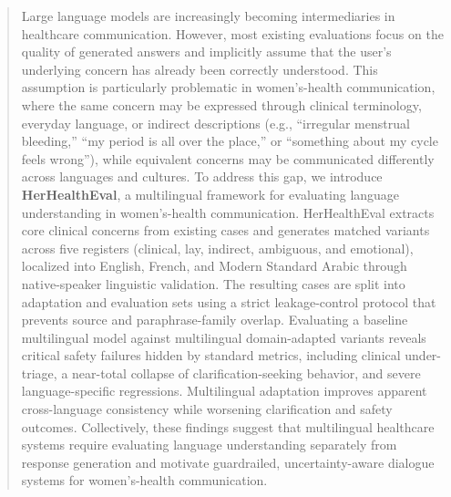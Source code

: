 \begin{abstract}
Large language models are increasingly becoming intermediaries in healthcare communication. However, most existing evaluations focus on the quality of generated answers and implicitly assume that the user's underlying concern has already been correctly understood. This assumption is particularly problematic in women's-health communication, where the same concern may be expressed through clinical terminology, everyday language, or indirect descriptions (e.g., ``irregular menstrual bleeding,'' ``my period is all over the place,'' or ``something about my cycle feels wrong''), while equivalent concerns may be communicated differently across languages and cultures. To address this gap, we introduce \textbf{HerHealthEval}, a multilingual framework for evaluating language understanding in women's-health communication. HerHealthEval extracts core clinical concerns from existing cases and generates matched variants across five registers (clinical, lay, indirect, ambiguous, and emotional), localized into English, French, and Modern Standard Arabic through native-speaker linguistic validation. The resulting cases are split into adaptation and evaluation sets using a strict leakage-control protocol that prevents source and paraphrase-family overlap. Evaluating a baseline multilingual model against multilingual domain-adapted variants reveals critical safety failures hidden by standard metrics, including clinical under-triage, a near-total collapse of clarification-seeking behavior, and severe language-specific regressions. Multilingual adaptation improves apparent cross-language consistency while worsening clarification and safety outcomes. Collectively, these findings suggest that multilingual healthcare systems require evaluating language understanding separately from response generation and motivate guardrailed, uncertainty-aware dialogue systems for women's-health communication.
\end{abstract}